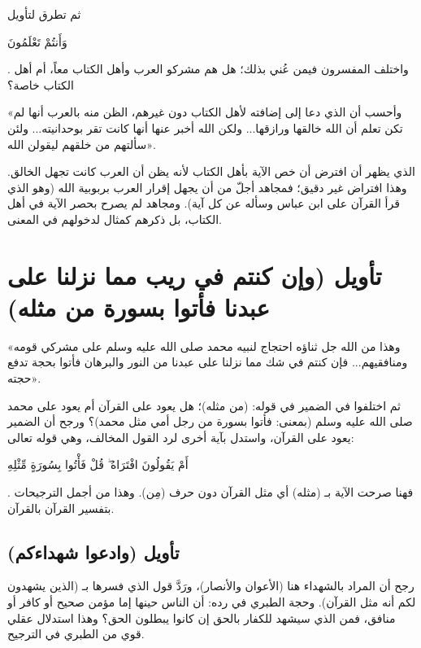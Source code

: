 ثم تطرق لتأويل \begin{ayah}وَأَنتُمْ تَعْلَمُونَ\end{ayah}. واختلف المفسرون فيمن عُني بذلك؛ هل هم مشركو العرب وأهل الكتاب معاً، أم أهل الكتاب خاصة؟

 «وأحسب أن الذي دعا  إلى إضافته لأهل الكتاب دون غيرهم، الظن منه بالعرب أنها لم تكن تعلم أن الله خالقها ورازقها... ولكن الله أخبر عنها أنها كانت تقر بوحدانيته... ولئن سألتهم من خلقهم ليقولن الله».

\begin{fawaid}
الذي يظهر أن  افترض أن  خص الآية بأهل الكتاب لأنه يظن أن العرب كانت تجهل الخالق. وهذا افتراض غير دقيق؛ فمجاهد أجلّ من أن يجهل إقرار العرب بربوبية الله (وهو الذي قرأ القرآن على ابن عباس وسأله عن كل آية). ومجاهد لم يصرح بحصر الآية في أهل الكتاب، بل ذكرهم كمثال لدخولهم في المعنى.
\end{fawaid}

\separator

\section{تأويل (وإن كنتم في ريب مما نزلنا على عبدنا فأتوا بسورة من مثله)}
 «وهذا من الله جل ثناؤه احتجاج لنبيه محمد صلى الله عليه وسلم على مشركي قومه ومنافقيهم... فإن كنتم في شك مما نزلنا على عبدنا من النور والبرهان فأتوا بحجة تدفع حجته».

ثم اختلفوا في الضمير في قوله: (من مثله)؛ هل يعود على القرآن أم يعود على محمد صلى الله عليه وسلم (بمعنى: فأتوا بسورة من رجل أمي مثل محمد)؟
ورجح  أن الضمير يعود على القرآن، واستدل بآية أخرى لرد القول المخالف، وهي قوله تعالى: \begin{ayah}أَمْ يَقُولُونَ افْتَرَاهُ ۖ قُلْ فَأْتُوا بِسُورَةٍ مِّثْلِهِ\end{ayah}. فهنا صرحت الآية بـ (مثله) أي مثل القرآن دون حرف (مِن). وهذا من أجمل الترجيحات بتفسير القرآن بالقرآن.

\subsection{تأويل (وادعوا شهداءكم)}
رجح  أن المراد بالشهداء هنا (الأعوان والأنصار)، ورَدَّ قول  الذي فسرها بـ (الذين يشهدون لكم أنه مثل القرآن). وحجة الطبري في رده: أن الناس حينها إما مؤمن صحيح أو كافر أو منافق، فمن الذي سيشهد للكفار بالحق إن كانوا يبطلون الحق؟ وهذا استدلال عقلي قوي من الطبري في الترجيح.

